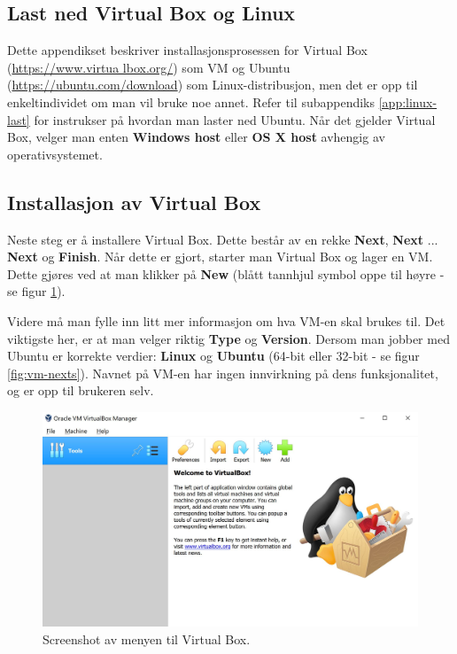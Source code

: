 \subsection{Last ned Virtual Box og Linux}
Dette appendikset beskriver installasjonsprosessen for Virtual Box (\href{https://www.virtualbox.org/}{https://www.virtua\newline
lbox.org/})  som VM og Ubuntu (\href{https://ubuntu.com/download}{https://ubuntu.com/download}) som Linux-distribusjon, men det er opp til enkeltindividet om man vil bruke noe annet. Refer til subappendiks \ref{app:linux-last} for instrukser på hvordan man laster ned Ubuntu. Når det gjelder Virtual Box, velger man enten \textbf{Windows host} eller \textbf{OS X host} avhengig av operativsystemet.


\subsection{Installasjon av Virtual Box}
Neste steg er å installere Virtual Box. Dette består av en rekke \textbf{Next}, \textbf{Next} ... \textbf{Next} og \textbf{Finish}. Når dette er gjort, starter man Virtual Box og lager en VM. Dette gjøres ved at man klikker på \textbf{New} (blått tannhjul symbol oppe til høyre - se figur \ref{fig:vm-forside}).

Videre må man fylle inn litt mer informasjon om hva VM-en skal brukes til. Det viktigste her, er at man velger riktig \textbf{Type} og \textbf{Version}. Dersom man jobber med Ubuntu er korrekte verdier: \textbf{Linux} og \textbf{Ubuntu} (64-bit eller 32-bit - se figur \ref{fig:vm-nexts}). Navnet på VM-en har ingen innvirkning på dens funksjonalitet, og er opp til brukeren selv. 


\begin{figure}[ht]
    \centering
    \includegraphics[scale = .63]{figures/VM_forside.JPG}
    \caption{Screenshot av menyen til Virtual Box.}
    \label{fig:vm-forside}
\end{figure}

